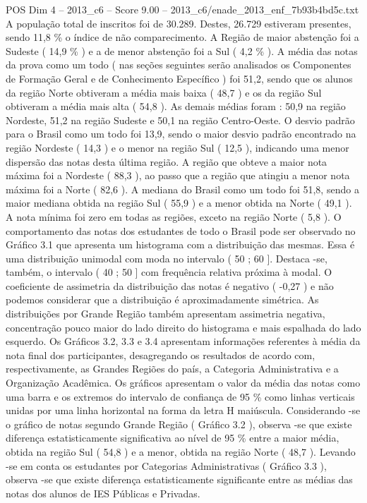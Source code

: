\begin{textsample}{POS Dim 4 – 2013\_c6 – Score 9.00 – 2013\_c6/enade\_2013\_enf\_7b93b4bd5c.txt}
A população total de inscritos foi de 30.289.
Destes, 26.729 estiveram presentes, sendo 11,8 \% o índice de não comparecimento.
A Região de maior abstenção foi a Sudeste ( 14,9 \% ) e a de menor abstenção foi a Sul ( 4,2 \% ).
A média das notas da prova como um todo ( nas seções seguintes serão analisados os Componentes de Formação Geral e de Conhecimento Específico ) foi 51,2, sendo que os alunos da região Norte obtiveram a média mais baixa ( 48,7 ) e os da região Sul obtiveram a média mais alta ( 54,8 ).
As demais médias foram : 50,9 na região Nordeste, 51,2 na região Sudeste e 50,1 na região Centro-Oeste.
O desvio padrão para o Brasil como um todo foi 13,9, sendo o maior desvio padrão encontrado na região Nordeste ( 14,3 ) e o menor na região Sul ( 12,5 ), indicando uma menor dispersão das notas desta última região.
A região que obteve a maior nota máxima foi a Nordeste ( 88,3 ), ao passo que a região que atingiu a menor nota máxima foi a Norte ( 82,6 ).
A mediana do Brasil como um todo foi 51,8, sendo a maior mediana obtida na região Sul ( 55,9 ) e a menor obtida na Norte ( 49,1 ).
A nota mínima foi zero em todas as regiões, exceto na região Norte ( 5,8 ).
O comportamento das notas dos estudantes de todo o Brasil pode ser observado no Gráfico 3.1 que apresenta um histograma com a distribuição das mesmas.
Essa é uma distribuição unimodal com moda no intervalo ( 50 ; 60 ].
Destaca -se, também, o intervalo ( 40 ; 50 ] com frequência relativa próxima à modal.
O coeficiente de assimetria da distribuição das notas é negativo ( -0,27 ) e não podemos considerar que a distribuição é aproximadamente simétrica.
As distribuições por Grande Região também apresentam assimetria negativa, concentração pouco maior do lado direito do histograma e mais espalhada do lado esquerdo.
Os Gráficos 3.2, 3.3 e 3.4 apresentam informações referentes à média da nota final dos participantes, desagregando os resultados de acordo com, respectivamente, as Grandes Regiões do país, a Categoria Administrativa e a Organização Acadêmica.
Os gráficos apresentam o valor da média das notas como uma barra e os extremos do intervalo de confiança de 95 \% como linhas verticais unidas por uma linha horizontal na forma da letra H maiúscula.
Considerando -se o gráfico de notas segundo Grande Região ( Gráfico 3.2 ), observa -se que existe diferença estatisticamente significativa ao nível de 95 \% entre a maior média, obtida na região Sul ( 54,8 ) e a menor, obtida na região Norte ( 48,7 ).
Levando -se em conta os estudantes por Categorias Administrativas ( Gráfico 3.3 ), observa -se que existe diferença estatisticamente significante entre as médias das notas dos alunos de IES Públicas e Privadas.

\end{textsample}
